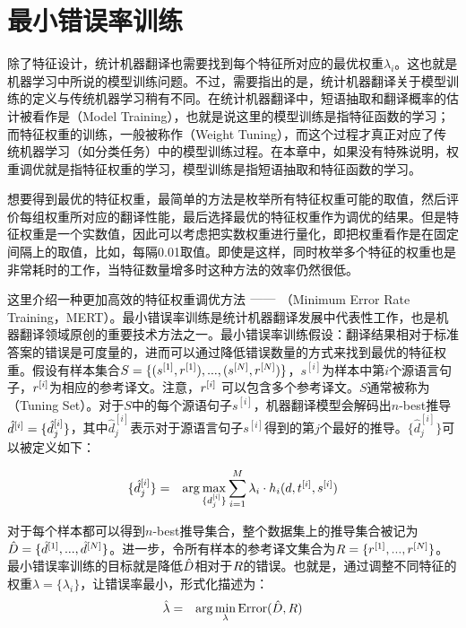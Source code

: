 \sectionnewpage
\section{最小错误率训练}\label{section-7.6}

\parinterval 除了特征设计，统计机器翻译也需要找到每个特征所对应的最优权重$\lambda_i$。这也就是机器学习中所说的模型训练问题。不过，需要指出的是，统计机器翻译关于模型训练的定义与传统机器学习稍有不同。在统计机器翻译中，短语抽取和翻译概率的估计被看作是{\small{}}（Model Training），也就是说这里的模型训练是指特征函数的学习；而特征权重的训练，一般被称作{\small{}}（Weight Tuning），而这个过程才真正对应了传统机器学习（如分类任务）中的模型训练过程。在本章中，如果没有特殊说明，权重调优就是指特征权重的学习，模型训练是指短语抽取和特征函数的学习。

\parinterval 想要得到最优的特征权重，最简单的方法是枚举所有特征权重可能的取值，然后评价每组权重所对应的翻译性能，最后选择最优的特征权重作为调优的结果。但是特征权重是一个实数值，因此可以考虑把实数权重进行量化，即把权重看作是在固定间隔上的取值，比如，每隔0.01取值。即使是这样，同时枚举多个特征的权重也是非常耗时的工作，当特征数量增多时这种方法的效率仍然很低。

\parinterval 这里介绍一种更加高效的特征权重调优方法$\ \dash \ ${\small{}}（Minimum Error Rate Training，MERT）。最小错误率训练是统计机器翻译发展中代表性工作，也是机器翻译领域原创的重要技术方法之一。最小错误率训练假设：翻译结果相对于标准答案的错误是可度量的，进而可以通过降低错误数量的方式来找到最优的特征权重。假设有样本集合$S = \{(s^{[1]},{r}^{[1]}),...,(s^{[N]},{r}^{[N]})\}$，$s^{[i]}$为样本中第$i$个源语言句子，${r}^{[i]}$为相应的参考译文。注意，${r}^{[i]}$ 可以包含多个参考译文。$S$通常被称为{\small{}}（Tuning Set）。对于$S$中的每个源语句子$s^{[i]}$，机器翻译模型会解码出$n$-best推导$\hat{{d}}^{[i]} = \{\hat{d}_{j}^{[i]}\}$，其中$\hat{d}_{j}^{[i]}$表示对于源语言句子$s^{[i]}$得到的第$j$个最好的推导。$\{\hat{d}_{j}^{[i]}\}$可以被定义如下：

\begin{eqnarray}
\{\hat{d}_{j}^{[i]}\} & = & \arg\max_{\{d_{j}^{[i]}\}} \sum_{i=1}^{M} \lambda_i \cdot h_i (d,{t}^{[i]},{s}^{[i]})
\label{eq:7-17}
\end{eqnarray}

\parinterval 对于每个样本都可以得到$n$-best推导集合，整个数据集上的推导集合被记为$\hat{{D}} = \{\hat{{d}}^{[1]},...,\hat{{d}}^{[N]}\}$。进一步，令所有样本的参考译文集合为${R} = \{{r}^{[1]},...,{r}^{[N]}\}$。最小错误率训练的目标就是降低$\hat{{D}}$相对于${R}$的错误。也就是，通过调整不同特征的权重$\lambda = \{ \lambda_i \}$，让错误率最小，形式化描述为：
\begin{eqnarray}
\hat{\lambda} & = & \arg\min_{\lambda} \textrm{Error}(\hat{{D}},{R})
\label{eq:7-18}
\end{eqnarray}

